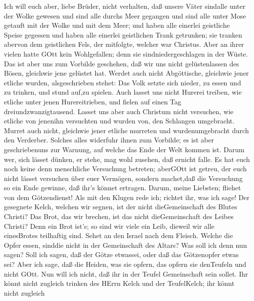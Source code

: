  Ich will euch aber, liebe Brüder, nicht verhalten, daß
unsere Väter sindalle unter der Wolke gewesen und sind alle durchs Meer
gegangen  und sind alle unter Mose getauft mit der Wolke und
mit dem Meer;  und haben alle einerlei geistliche Speise
gegessen  und haben alle einerlei geistlichen Trank
getrunken; sie tranken abervon dem geistlichen Fels, der mitfolgte,
welcher war Christus.  Aber an ihrer vielen hatte GOtt kein
Wohlgefallen; denn sie sindniedergeschlagen in der Wüste. 
Das ist aber uns zum Vorbilde geschehen, daß wir uns nicht
gelüstenlassen des Bösen, gleichwie jene gelüstet hat. 
Werdet auch nicht Abgöttische, gleichwie jener etliche wurden,
alsgeschrieben stehet: Das Volk setzte sich nieder, zu essen und zu
trinken, und stund auf,zu spielen.  Auch lasset uns nicht
Hurerei treiben, wie etliche unter jenen Hurereitrieben, und fielen auf
einen Tag dreiundzwanzigtausend.  Lasset uns aber auch
Christum nicht versuchen, wie etliche von jenenihn versuchten und wurden
von, den Schlangen umgebracht.  Murret auch nicht,
gleichwie jener etliche murreten und wurdenumgebracht durch den
Verderber.  Solches alles widerfuhr ihnen zum Vorbilde; es
ist aber geschriebenuns zur Warnung, auf welche das Ende der Welt kommen
ist.  Darum wer, sich lässet dünken, er stehe, mag wohl
zusehen, daß ernicht falle.  Es hat euch noch keine denn
menschliche Versuchung betreten; aberGOtt ist getreu, der euch nicht
lässet versuchen über euer Vermögen, sondern machet,daß die Versuchung
so ein Ende gewinne, daß ihr's könnet ertragen.  Darum,
meine Liebsten; fliehet von dem Götzendienst!  Als mit den
Klugen rede ich; richtet ihr, was ich sage!  Der gesegnete
Kelch, welchen wir segnen, ist der nicht dieGemeinschaft des Blutes
Christi? Das Brot, das wir brechen, ist das nicht dieGemeinschaft des
Leibes Christi?  Denn ein Brot ist's; so sind wir viele ein
Leib, dieweil wir alle einesBrotes teilhaftig sind.  Sehet
an den Israel nach dem Fleisch. Welche die Opfer essen, sinddie nicht in
der Gemeinschaft des Altars?  Was soll ich denn nun sagen?
Soll ich sagen, daß der Götze etwassei, oder daß das Götzenopfer etwas
sei?  Aber ich sage, daß die Heiden, was sie opfern, das
opfern sie denTeufeln und nicht GOtt. Nun will ich nicht, daß ihr in der
Teufel Gemeinschaft sein sollet.  Ihr könnt nicht zugleich
trinken des HErrn Kelch und der TeufelKelch; ihr könnt nicht zugleich
